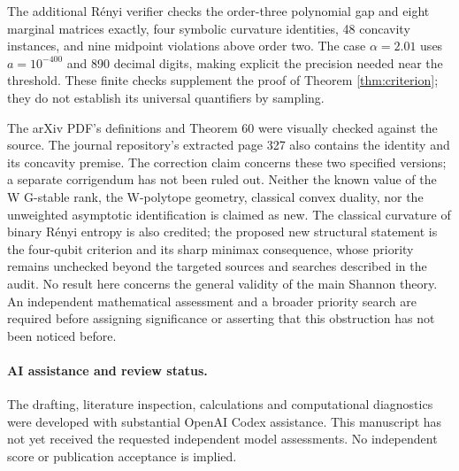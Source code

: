 \documentclass[11pt,a4paper]{article}
\begin{document}
The additional R\'enyi verifier checks the order-three polynomial
gap and eight marginal matrices exactly, four symbolic curvature
identities, 48 concavity instances, and nine midpoint violations
above order two. The case \(\alpha=2.01\) uses \(a=10^{-400}\)
and 890 decimal digits, making explicit the precision needed near
the threshold. These finite checks supplement the proof of
Theorem \ref{thm:criterion}; they do not establish its universal
quantifiers by sampling.

The arXiv PDF's definitions and Theorem 60 were visually checked
against the source. The journal repository's extracted page 327
also contains the identity and its concavity premise. The correction
claim concerns these two specified versions; a separate corrigendum
has not been ruled out. Neither the known value of the W
G-stable rank, the W-polytope geometry, classical convex duality,
nor the unweighted asymptotic identification is claimed as new.
The classical curvature of binary R\'enyi entropy is also credited;
the proposed new structural statement is the four-qubit criterion
and its sharp minimax consequence, whose priority remains unchecked
beyond the targeted sources and searches described in the audit.
No result here concerns the general validity of the main Shannon
theory. An independent mathematical assessment and a broader
priority search are required before assigning significance or
asserting that this obstruction has not been noticed before.

\paragraph{AI assistance and review status.}
The drafting, literature inspection, calculations and computational
diagnostics were developed with substantial OpenAI Codex assistance.
This manuscript has not yet received the requested independent
model assessments. No independent score or publication acceptance
is implied.
\end{document}
